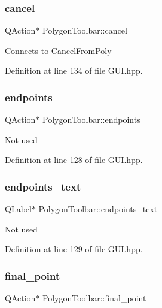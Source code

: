 \subsubsection{\texorpdfstring{cancel}{cancel}}
{\footnotesize\ttfamily Q\+Action$\ast$ Polygon\+Toolbar\+::cancel}

Connects to Cancel\+From\+Poly 

Definition at line 134 of file G\+U\+I.\+hpp.

\mbox{\label{structPolygonToolbar_a78a569efc30754e02b7d8f5d74ede0ec}} 
\subsubsection{\texorpdfstring{endpoints}{endpoints}}
{\footnotesize\ttfamily Q\+Action$\ast$ Polygon\+Toolbar\+::endpoints}

Not used 

Definition at line 128 of file G\+U\+I.\+hpp.

\mbox{\label{structPolygonToolbar_a4ab3ad9905d894a2f166a4e1cbfb9e3a}} 
\subsubsection{\texorpdfstring{endpoints\+\_\+text}{endpoints\_text}}
{\footnotesize\ttfamily Q\+Label$\ast$ Polygon\+Toolbar\+::endpoints\+\_\+text}

Not used 

Definition at line 129 of file G\+U\+I.\+hpp.

\mbox{\label{structPolygonToolbar_a25d471a6081bfa4107d5f1cd9a61d243}} 
\subsubsection{\texorpdfstring{final\+\_\+point}{final\_point}}
{\footnotesize\ttfamily Q\+Action$\ast$ Polygon\+Toolbar\+::final\+\_\+point}

